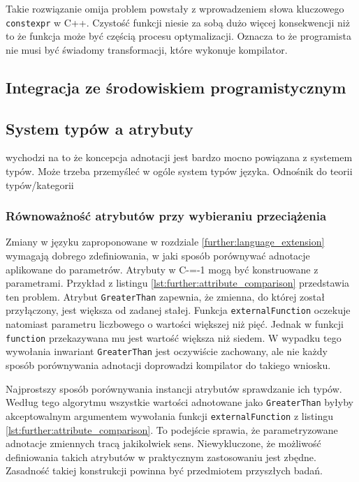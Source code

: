 Takie rozwiązanie omija problem powstały z wprowadzeniem słowa kluczowego \lstinline{constexpr} w C++\cite{Klimiankou:contexpr_great_good_wrong_idea}.
Czystość funkcji niesie za sobą dużo więcej konsekwencji niż to że funkcja może być częścią procesu optymalizacji.
Oznacza to że programista nie musi być świadomy transformacji, które wykonuje kompilator.

\subsection{Integracja ze środowiskiem programistycznym}
\label{IDE_integration}

\subsection{System typów a atrybuty}
\label{further:adnotated_type_system}

wychodzi na to że koncepcja adnotacji jest bardzo mocno powiązana z systemem typów. Może trzeba przemyśleć w ogóle system typów języka. Odnośnik do teorii typów/kategorii

\subsubsection{Równoważność atrybutów przy wybieraniu przeciążenia}
\label{further:adnotated_type_system:attribute_equivalence}

Zmiany w języku zaproponowane w rozdziale \ref{further:language_extension} wymagają dobrego zdefiniowania, w jaki sposób porównywać adnotacje aplikowane do parametrów.
Atrybuty w C-=-1 mogą być konstruowane z parametrami.
Przykład z listingu \ref{lst:further:attribute_comparison} przedstawia ten problem.
Atrybut \lstinline{GreaterThan} zapewnia, że zmienna, do której został przyłączony, jest większa od zadanej stałej.
Funkcja \lstinline{externalFunction} oczekuje natomiast parametru liczbowego o wartości większej niż pięć.
Jednak w funkcji \lstinline{function} przekazywana mu jest wartość większa niż siedem.
W wypadku tego wywołania inwariant \lstinline{GreaterThan} jest oczywiście zachowany, ale nie każdy sposób porównywania adnotacji doprowadzi kompilator do takiego wniosku.

Najprostszy sposób porównywania instancji atrybutów sprawdzanie ich typów.
Według tego algorytmu wszystkie wartości adnotowane jako \lstinline{GreaterThan} byłyby akceptowalnym argumentem wywołania funkcji \lstinline{externalFunction} z listingu \ref{lst:further:attribute_comparison}.
To podejście sprawia, że parametryzowane adnotacje zmiennych tracą jakikolwiek sens.
Niewykluczone, że możliwość definiowania takich atrybutów w praktycznym zastosowaniu jest zbędne.
Zasadność takiej konstrukcji powinna być przedmiotem przyszłych badań.

